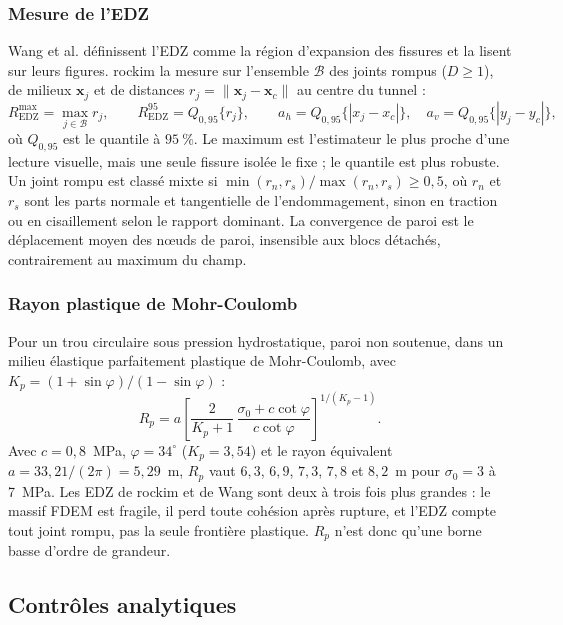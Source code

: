 \subsubsection{Mesure de l'EDZ}

Wang et al. définissent l'EDZ comme la région d'expansion des fissures et la lisent sur leurs figures. rockim la mesure sur l'ensemble $\mathcal B$ des joints rompus ($D \geq 1$), de milieux $\mathbf x_j$ et de distances $r_j = \|\mathbf x_j - \mathbf x_c\|$ au centre du tunnel :
\begin{equation}
R_\text{EDZ}^\text{max} = \max_{j \in \mathcal B} r_j, \qquad
R_\text{EDZ}^{95} = Q_{0,95}\{r_j\}, \qquad
a_h = Q_{0,95}\{|x_j - x_c|\}, \quad a_v = Q_{0,95}\{|y_j - y_c|\},
\label{eq-tun-edz}
\end{equation}
où $Q_{0,95}$ est le quantile à $95~\%$. Le maximum est l'estimateur le plus proche d'une lecture visuelle, mais une seule fissure isolée le fixe ; le quantile est plus robuste. Un joint rompu est classé mixte si $\min(r_n, r_s)/\max(r_n, r_s) \geq 0{,}5$, où $r_n$ et $r_s$ sont les parts normale et tangentielle de l'endommagement, sinon en traction ou en cisaillement selon le rapport dominant. La convergence de paroi est le déplacement moyen des nœuds de paroi, insensible aux blocs détachés, contrairement au maximum du champ.

\subsubsection{Rayon plastique de Mohr-Coulomb}

Pour un trou circulaire sous pression hydrostatique, paroi non soutenue, dans un milieu élastique parfaitement plastique de Mohr-Coulomb, avec $K_p = (1 + \sin\varphi)/(1 - \sin\varphi)$ :
\begin{equation}
R_p = a\left[\frac{2}{K_p + 1}\,\frac{\sigma_0 + c\cot\varphi}{c\cot\varphi}\right]^{1/(K_p - 1)} .
\label{eq-tun-rp}
\end{equation}
Avec $c = 0{,}8$~MPa, $\varphi = 34^\circ$ ($K_p = 3{,}54$) et le rayon équivalent $a = 33{,}21/(2\pi) = 5{,}29$~m, $R_p$ vaut $6{,}3$, $6{,}9$, $7{,}3$, $7{,}8$ et $8{,}2$~m pour $\sigma_0 = 3$ à 7~MPa. Les EDZ de rockim et de Wang sont deux à trois fois plus grandes : le massif FDEM est fragile, il perd toute cohésion après rupture, et l'EDZ compte tout joint rompu, pas la seule frontière plastique. $R_p$ n'est donc qu'une borne basse d'ordre de grandeur.

\subsection{Contrôles analytiques}
\label{sec-tunnel-controles}

